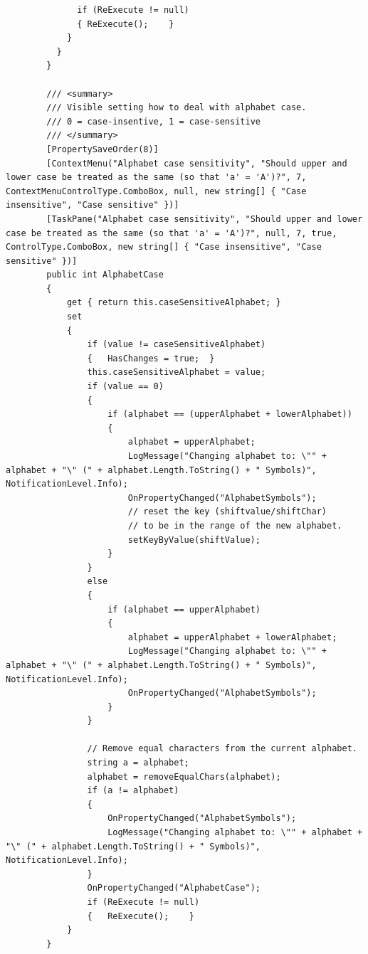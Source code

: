 \begin{lstlisting}
              if (ReExecute != null)
              {	ReExecute();	}
            }
          }
        }

        /// <summary>
        /// Visible setting how to deal with alphabet case.
        /// 0 = case-insentive, 1 = case-sensitive
        /// </summary>
        [PropertySaveOrder(8)]
        [ContextMenu("Alphabet case sensitivity", "Should upper and lower case be treated as the same (so that 'a' = 'A')?", 7, ContextMenuControlType.ComboBox, null, new string[] { "Case insensitive", "Case sensitive" })]
        [TaskPane("Alphabet case sensitivity", "Should upper and lower case be treated as the same (so that 'a' = 'A')?", null, 7, true, ControlType.ComboBox, new string[] { "Case insensitive", "Case sensitive" })]
        public int AlphabetCase
        {
            get { return this.caseSensitiveAlphabet; }
            set
            {
                if (value != caseSensitiveAlphabet)
                {	HasChanges = true;	}
                this.caseSensitiveAlphabet = value;
                if (value == 0)
                {
                    if (alphabet == (upperAlphabet + lowerAlphabet))
                    {
                        alphabet = upperAlphabet;
                        LogMessage("Changing alphabet to: \"" + alphabet + "\" (" + alphabet.Length.ToString() + " Symbols)", NotificationLevel.Info);
                        OnPropertyChanged("AlphabetSymbols");
                        // reset the key (shiftvalue/shiftChar)
                        // to be in the range of the new alphabet.
                        setKeyByValue(shiftValue);
                    }
                }
                else
                {
                    if (alphabet == upperAlphabet)
                    {
                        alphabet = upperAlphabet + lowerAlphabet;
                        LogMessage("Changing alphabet to: \"" + alphabet + "\" (" + alphabet.Length.ToString() + " Symbols)", NotificationLevel.Info);
                        OnPropertyChanged("AlphabetSymbols");
                    }
                }

                // Remove equal characters from the current alphabet.
                string a = alphabet;
                alphabet = removeEqualChars(alphabet);
                if (a != alphabet)
                {
                    OnPropertyChanged("AlphabetSymbols");
                    LogMessage("Changing alphabet to: \"" + alphabet + "\" (" + alphabet.Length.ToString() + " Symbols)", NotificationLevel.Info);
                }
                OnPropertyChanged("AlphabetCase");
                if (ReExecute != null)
                {	ReExecute();	}
            }
        }


\end{lstlisting}
